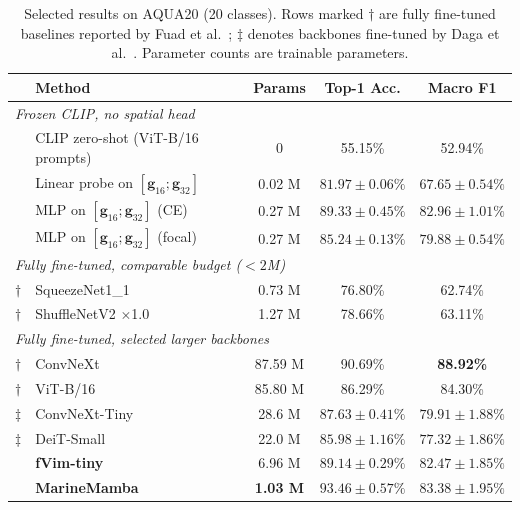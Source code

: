 \documentclass[runningheads]{llncs}
\begin{document}
\begin{table}[t]
\centering
\caption{Selected results on AQUA20 (20 classes). Rows marked $\dagger$ are fully fine-tuned baselines reported by Fuad et al.~\cite{fuad2026aqua20}; $\ddagger$ denotes backbones fine-tuned by Daga et al.~\cite{daga2026aquaselect}. Parameter counts are trainable parameters.}
\label{tab:aqua20}
\begin{tabular}{llccc}
\toprule
& Method & Params & Top-1 Acc. & Macro F1 \\
\midrule
\multicolumn{5}{l}{\emph{Frozen CLIP, no spatial head}} \\
& CLIP zero-shot (ViT-B/16 prompts)      & 0       & 55.15\%          & 52.94\% \\
& Linear probe on $[\mathbf{g}_{16};\mathbf{g}_{32}]$ & 0.02 M & $81.97\pm0.06\%$ & $67.65\pm0.54\%$ \\
& MLP on $[\mathbf{g}_{16};\mathbf{g}_{32}]$ (CE)     & 0.27 M & $89.33\pm0.45\%$ & $82.96\pm1.01\%$ \\
& MLP on $[\mathbf{g}_{16};\mathbf{g}_{32}]$ (focal)  & 0.27 M & $85.24\pm0.13\%$ & $79.88\pm0.54\%$ \\
\midrule
\multicolumn{5}{l}{\emph{Fully fine-tuned, comparable budget ($<2$M)}} \\
$\dagger$ & SqueezeNet1\_1~\cite{iandola2016squeezenet}                & 0.73 M  & 76.80\%          & 62.74\% \\
$\dagger$ & ShuffleNetV2 $\times$1.0~\cite{ma2018shufflenetv2}      & 1.27 M  & 78.66\%          & 63.11\% \\
\midrule
\multicolumn{5}{l}{\emph{Fully fine-tuned, selected larger backbones}} \\
$\dagger$ & ConvNeXt~\cite{liu2022convnext}          & 87.59 M & 90.69\%          & \textbf{88.92\%} \\
$\dagger$ & ViT-B/16~\cite{dosovitskiy2021vit}       & 85.80 M & 86.29\%          & 84.30\% \\
$\ddagger$ & ConvNeXt-Tiny~\cite{liu2022convnext}    & 28.6 M  & $87.63\pm0.41\%$ & $79.91\pm1.88\%$ \\
$\ddagger$ & DeiT-Small~\cite{touvron2021deit}       & 22.0 M  & $85.98\pm1.16\%$ & $77.32\pm1.86\%$ \\
 \midrule
 & \textbf{fVim-tiny} & 6.96 M  & $89.14\pm0.29\%$ & $82.47\pm1.85\%$ \\
 & \textbf{MarineMamba}             & \textbf{1.03 M} & $\mathbf{93.46\pm0.57\%}$ & $83.38\pm1.95\%$ \\
\bottomrule
\end{tabular}
\end{table}
\end{document}
